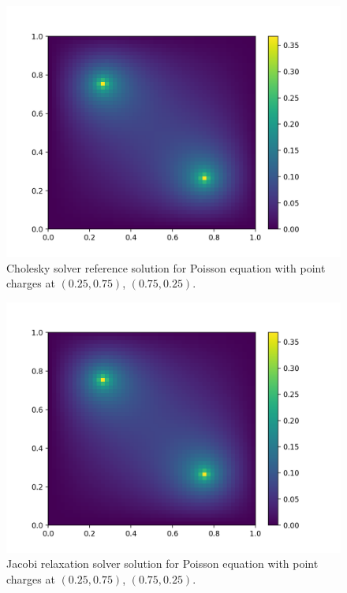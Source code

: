 \documentclass[11pt,a4paper]{article}
\begin{document}
\begin{figure}[ht]
\begin{center}
\includegraphics[scale=1.2]{figure_1.png} 
\end{center}
\caption{Cholesky solver reference solution for Poisson equation with point charges at $(0.25, 0.75)$, $(0.75, 0.25)$.}
\label{fig:1}
\end{figure}

\begin{figure}[ht]
\begin{center}
\includegraphics[scale=1.2]{figure_2.png} 
\end{center}
\caption{Jacobi relaxation solver solution for Poisson equation with point charges at $(0.25, 0.75)$, $(0.75, 0.25)$.}
\label{fig:2}
\end{figure}
\end{document}
